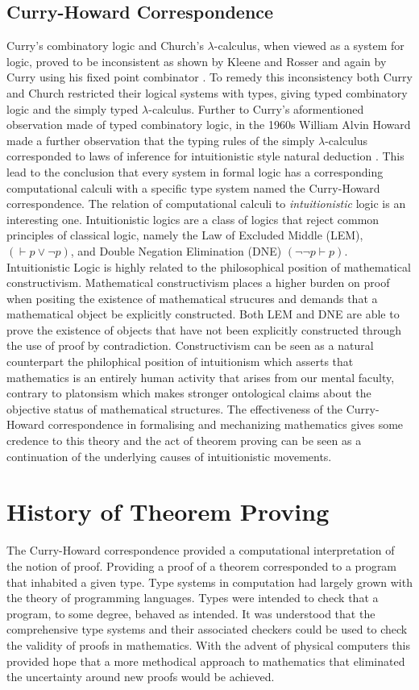 \subsection{Curry-Howard Correspondence}
Curry's combinatory logic and Church's $\lambda$-calculus, when viewed as a
system for logic, proved to be inconsistent as shown by Kleene and Rosser
\cite{kleene1935inconsistency} and again by Curry using his fixed point
combinator \cite{curry1941paradox}. To remedy this inconsistency both Curry and
Church restricted their logical systems with types, giving typed combinatory logic
and the simply typed $\lambda$-calculus. Further to Curry's aformentioned
observation made of typed combinatory logic, in the 1960s William Alvin Howard
made a further observation that the typing rules of the simply
$\lambda$-calculus corresponded to laws of inference for intuitionistic style
natural deduction \cite{howard1980formulae}. This lead to the conclusion that
every system in formal logic has a corresponding computational calculi with a
specific type system named the Curry-Howard correspondence. The relation of
computational calculi to \textit{intuitionistic} logic is an interesting one.
Intuitionistic logics are a class of logics that reject common principles
of classical logic, namely the Law of Excluded Middle (LEM), $(\vdash p \lor \lnot p)$,
and Double Negation Elimination (DNE) $(\lnot \lnot p \vdash p)$. Intuitionistic Logic
is highly related to the philosophical position of mathematical constructivism.
Mathematical constructivism places a higher burden on proof when positing the
existence of mathematical strucures and demands that a mathematical object be
explicitly constructed.  Both LEM and DNE are able to prove the existence of
objects that have not been explicitly constructed through the use of proof by
contradiction. Constructivism can be seen as a natural counterpart the
philophical position of intuitionism which asserts that mathematics is an
entirely human activity that arises from our mental faculty, contrary to
platonsism which makes stronger ontological claims about the objective status of
mathematical structures. The effectiveness of the Curry-Howard correspondence in
formalising and mechanizing mathematics gives some credence to this theory and
the act of theorem proving can be seen as a continuation of the underlying
causes of intuitionistic movements.

\section{History of Theorem Proving}
The Curry-Howard correspondence provided a computational interpretation of the
notion of proof. Providing a proof of a theorem corresponded to a program that
inhabited a given type. Type systems in computation had largely grown with the
theory of programming languages. Types were intended to check that a program, to
some degree, behaved as intended. It was understood that the comprehensive type
systems and their associated checkers could be used to check the validity of
proofs in mathematics. With the advent of physical computers this provided hope
that a more methodical approach to mathematics that eliminated the uncertainty
around new proofs would be achieved.

